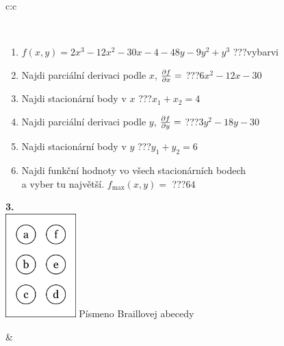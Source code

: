 \documentclass[10pt]{report}
\begin{document}
\begin{tabular}{c:c}
\begin{minipage}[c][104.5mm][t]{0.5\linewidth}
\begin{center}
\begin{minipage}{0.95\linewidth}
\begin{center}
\end{center}
\end{minipage}
\\[1mm]
\begin{minipage}{0.79\linewidth}
\begin{center}
\begin{varwidth}{\linewidth}
\begin{enumerate}
\normalsize
\item $f(x,y)=2x^3-12x^2-30x-4-48y-9y^2+y^3$\quad \dotfill\; ???\;\dotfill \quad vybarvi
\item Najdi parciální derivaci podle $x$, $\pdv{f}{x}=$\quad \dotfill\; ???\;\dotfill \quad $6x^2-12x-30$
\item Najdi stacionární body v $x$\quad \dotfill\; ???\;\dotfill \quad $x_1+x_2=4$
\item Najdi parciální derivaci podle $y$, $\pdv{f}{y}=$\quad \dotfill\; ???\;\dotfill \quad $3y^2-18y-30$
\item Najdi stacionární body v $y$\quad \dotfill\; ???\;\dotfill \quad $y_1+y_2=6$
\item Najdi funkční hodnoty vo všech stacionárních bodech \\ \phantom{xxxxxx} a vyber tu najvětší. $f_{\text{max}}(x,y)=$\quad \dotfill\; ???\;\dotfill \quad $64$
\end{enumerate}
\end{varwidth}
\end{center}
\end{minipage}
\begin{minipage}{0.20\linewidth}
\begin{center}
{\Huge\bfseries 3.} \\[2mm]
\includegraphics[height=40mm]{../images/braille.png}
{\small Písmeno Braillovej abecedy}
\end{center}
\end{minipage}
\end{center}
\end{minipage}
&
\begin{minipage}[c][104.5mm][t]{0.5\linewidth}
\begin{center}

\end{center}
\end{minipage}
\end{tabular}
\end{document}
